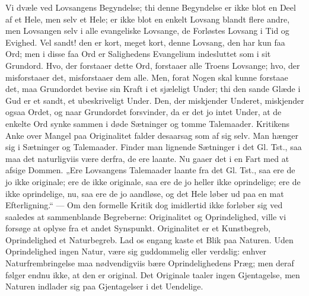 \documentclass[12pt,a4paper]{book}
\begin{document}
Vi dvæle ved Lovsangens Begyndelse; thi denne Begyndelse er ikke blot en Deel af
et Hele, men selv et Hele; er ikke blot en enkelt Lovsang blandt flere andre, men
Lovsangen selv i alle evangeliske Lovsange, de Forløstes Lovsang i Tid og
Evighed. Vel sandt! den er kort, meget kort, denne Lovsang, den har kun faa Ord;
men i disse faa Ord er Salighedens Evangelium indesluttet som i sit Grundord.
Hvo, der forstaaer dette Ord, forstaaer alle Troens Lovsange; hvo, der
misforstaaer det, misforstaaer dem alle. Men, forat Nogen skal kunne forstaae
det, maa Grundordet bevise sin Kraft i et sjæleligt Under; thi den sande Glæde i
Gud er et sandt, et ubeskriveligt Under. Den, der miskjender Underet, miskjender
ogsaa Ordet, og naar Grundordet forsvinder, da er det jo intet Under, at de
enkelte Ord synke sammen i døde Sætninger og tomme Talemaader. Kritikens Anke
over Mangel paa Originalitet falder desaarsag som af sig selv. Man hænger sig i
Sætninger og Talemaader. Finder man lignende Sætninger i det Gl. Tst., saa maa
det naturligviis være derfra, de ere laante. Nu gaaer det i en Fart med at afsige
Dommen. „Ere Lovsangens Talemaader laante fra det Gl. Tst., saa ere de jo ikke
originale; ere de ikke originale, saa ere de jo heller ikke oprindelige; ere de
ikke oprindelige, nu, saa ere de jo aandløse, og det Hele løber ud paa en mat
Efterligning.“ --- Om den formelle Kritik dog imidlertid ikke forløber sig ved
saaledes at sammenblande Begreberne: Originalitet og Oprindelighed, ville vi
forsøge at oplyse fra et andet Synspunkt. Originalitet er et Kunstbegreb,
Oprindelighed et Naturbegreb. Lad os engang kaste et Blik paa Naturen. Uden
Oprindelighed ingen Natur, være sig guddommelig eller verdslig: enhver
Naturfrembringelse maa nødvendigviis bære Oprindelighedens Præg; men deraf følger
endnu ikke, at den er original. Det Originale taaler ingen Gjentagelse, men
Naturen indlader sig paa Gjentagelser i det Uendelige.
\end{document}
